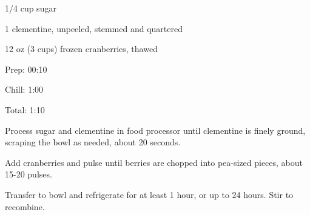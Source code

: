 \documentclass[oneside]{book}  %
\def\thisrecipe{}  %
\newcommand{\recipe}[1]{\section{#1}\def\thisrecipe{: #1}} %
\begin{document}
\begin{IT}
  \begin{ingredients}[serves=6-8]
    \item[1/4 cup] sugar
    \item[1] clementine, unpeeled, stemmed and quartered
    \item[12 oz (3 cups)] frozen cranberries, thawed
  \end{ingredients}

  \switchcolumn

  \begin{timeline}
    \item[Prep:]   00:10
    \item[Chill:]  1:00
    \item[Total:]  1:10
  \end{timeline}
\end{IT}

\begin{directions}
  \item Process sugar and clementine in food processor until clementine is
  finely ground, scraping the bowl as needed, about 20 seconds.

  \item Add cranberries and pulse until berries are chopped into pea-sized
  pieces, about 15-20 pulses.

  \item Transfer to bowl and refrigerate for at least 1 hour, or up to 24 hours.
  Stir to recombine.
\end{directions}
\end{document}
